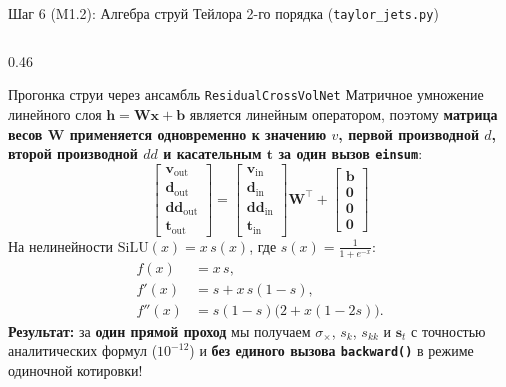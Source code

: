 \documentclass[aspectratio=169, 9pt]{beamer}
\begin{document}
\begin{frame}{Шаг 6 (M1.2): Алгебра струй Тейлора 2-го порядка (\texttt{taylor\_jets.py})}
\begin{columns}[T]
    \begin{column}{0.46\textwidth}
      \begin{exampleblock}{Прогонка струи через ансамбль \texttt{ResidualCrossVolNet}}
        Матричное умножение линейного слоя $\bm{h} = \bm{W}\bm{x} + \bm{b}$ является линейным оператором, поэтому \textbf{матрица весов $\bm{W}$ применяется одновременно к значению $v$, первой производной $d$, второй производной $dd$ и касательным $\bm{t}$ за один вызов \texttt{einsum}}:
        $$\begin{bmatrix} \bm{v}_{\text{out}} \\ \bm{d}_{\text{out}} \\ \bm{dd}_{\text{out}} \\ \bm{t}_{\text{out}} \end{bmatrix}
          = \begin{bmatrix} \bm{v}_{\text{in}} \\ \bm{d}_{\text{in}} \\ \bm{dd}_{\text{in}} \\ \bm{t}_{\text{in}} \end{bmatrix} \bm{W}^\top
          + \begin{bmatrix} \bm{b} \\ \bm{0} \\ \bm{0} \\ \bm{0} \end{bmatrix}$$
        На нелинейности $\text{SiLU}(x) = x\,s(x)$, где $s(x) = \frac{1}{1+e^{-x}}$:
        $$\begin{aligned}
          f(x) &= x\,s, \\
          f'(x) &= s + x\,s(1 - s), \\
          f''(x) &= s(1 - s)\big(2 + x(1 - 2s)\big).
        \end{aligned}$$
        \textbf{Результат:} за \textbf{один прямой проход} мы получаем $\sigma_\times$, $s_k$, $s_{kk}$ и $\bm{s}_t$ с точностью аналитических формул ($10^{-12}$) и \textbf{без единого вызова \texttt{backward()}} в режиме одиночной котировки!
      \end{exampleblock}
    \end{column}
  \end{columns}
\end{frame}
\end{document}
